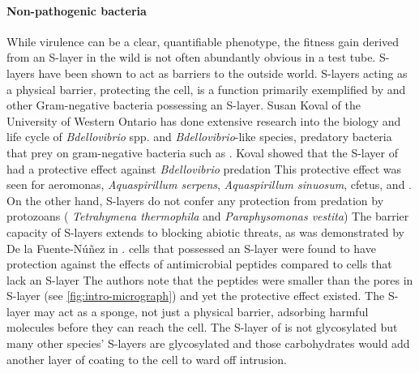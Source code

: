 \paragraph{Non-pathogenic bacteria} \label{sec:non-path-bact} %
While virulence can be a clear, quantifiable phenotype, the fitness gain derived from an \ac{S-layer} in the wild is not often abundantly obvious in a test tube. \acp{S-layer} have
been shown to act as barriers to the outside world. \acp{S-layer} acting as a physical barrier, protecting the cell, is a function primarily exemplified by \caulobacter and other
Gram-negative bacteria possessing an \ac{S-layer}. Susan Koval of the University of Western Ontario has done extensive research into the biology and life cycle of
\textit{Bdellovibrio} spp. and \textit{Bdellovibrio}-like species, predatory bacteria that prey on gram-negative bacteria such as \caulobacter. Koval showed that the \ac{S-layer}
of \caulobacter had a protective effect against \textit{Bdellovibrio} predation This protective effect was seen for \ac{aeromonas}, \textit{Aquaspirillum
serpens}, \textit{Aquaspirillum sinuosum}, \ac{cfetus}, and \caulobacter. On the other hand, \acp{S-layer} do not confer any protection from predation by protozoans (\eg{}
\textit{Tetrahymena thermophila} and \textit{Paraphysomonas vestita}) The barrier capacity of \acp{S-layer} extends to blocking abiotic threats, as
was demonstrated by De la Fuente-N{\'u}{\~n}ez \etal in . \caulobacter cells that possessed an \ac{S-layer} were found to have protection against the effects of
antimicrobial peptides compared to cells that lack an \ac{S-layer} The authors note that the peptides were smaller than the pores in \caulobacter
\ac{S-layer} (see \cref{fig:intro-micrograph}) and yet the protective effect existed. The \ac{S-layer} may act as a sponge, not just a physical barrier, adsorbing harmful molecules
before they can reach the cell. The \ac{S-layer} of \caulobacter{} is not glycosylated but many other species' \acp{S-layer} are glycosylated and those carbohydrates would add
another layer of coating to the cell to ward off intrusion.


